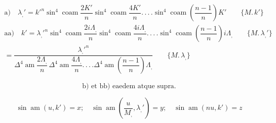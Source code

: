 \documentclass{article}
\begin{document}
\[
\begin{gathered}
\text{a)}\quad \lambda_{,}'=k'^{n}\sin^{4}\operatorname{coam}\dfrac{2K'}{n}\sin^{4}\operatorname{coam}\dfrac{4K'}{n}.\,.\,.\,.\sin^{4}\operatorname{coam}\left(\dfrac{n-1}{n}\right)K'\qquad\{M.\,k'\}\\[1.5ex]
\text{aa)}\quad k'={\lambda_{,}'}^{n}\sin^{4}\operatorname{coam}\dfrac{2i\Lambda_{,}}{n}\sin^{4}\operatorname{coam}\dfrac{4i\Lambda_{,}}{n}.\,.\,.\,.\sin^{4}\operatorname{coam}\left(\dfrac{n-1}{n}\right)i\Lambda_{,}\qquad\{M.\,\lambda_{,}'\}\\[1.5ex]
{}=\dfrac{{\lambda_{,}'}^{n}}{\Delta^{4}\operatorname{am}\dfrac{2\Lambda_{,}}{n}\,\Delta^{4}\operatorname{am}\dfrac{4\Lambda_{,}}{n}.\,.\,.\,.\Delta^{4}\operatorname{am}\left(\dfrac{n-1}{n}\right)\Lambda_{,}}\qquad\{M.\,\lambda_{,}\}
\end{gathered}
\]

\[\text{b) et bb) eaedem atque supra.}\]

\[
\sin\operatorname{am}(u,k')=x;\quad \sin\operatorname{am}\left(\dfrac{u}{M_{,}},\lambda_{,}'\right)=y;\quad \sin\operatorname{am}(nu,k')=z
\]
\end{document}
